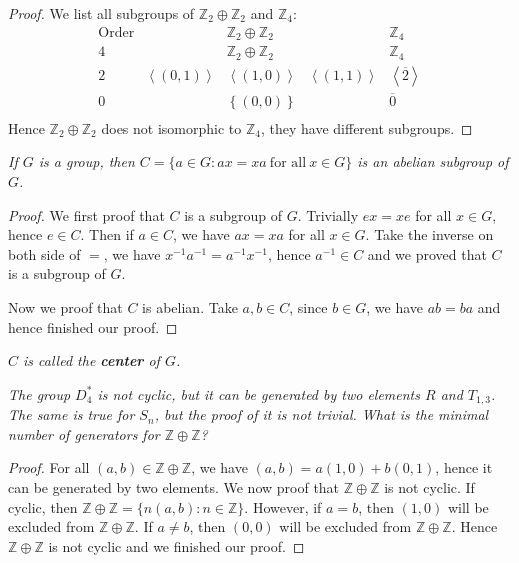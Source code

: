\begin{proof}
We list all subgroups of $\mathbb{Z}_2\oplus\mathbb{Z}_2$ and $\mathbb{Z}_4$:
$$
\begin{matrix}
	\mathrm{Order}&		&		\mathbb{Z} _2\oplus \mathbb{Z} _2&		&		\mathbb{Z} _4\\
	4&		&		\mathbb{Z} _2\oplus \mathbb{Z} _2&		&		\mathbb{Z} _4\\
	2&		\left< \left( 0,1 \right) \right>&		\left< \left( 1,0 \right) \right>&		\left< \left( 1,1 \right) \right>&		\left< \overline{2} \right>\\
	0&		&		\left\{ \left( 0,0 \right) \right\}&		&		\overline{0}\\
\end{matrix}
$$
Hence $\mathbb{Z}_2\oplus\mathbb{Z}_2$ does not isomorphic to $\mathbb{Z}_4$, they have different subgroups.
\end{proof}
\begin{problem}\em
If $G$ is a group, then $C=\{a\in G:ax=xa\ \text{for all}\ x\in G\}$ is an abelian subgroup of $G$.
\end{problem}
\begin{proof}
We first proof that $C$ is a subgroup of $G$. Trivially $ex=xe$ for all $x\in G$, hence $e\in C$. Then if $a\in C$, we have $ax=xa$ for all $x\in G$. Take the inverse on both side of $=$, we have $x^{-1}a^{-1}=a^{-1}x^{-1}$, hence $a^{-1}\in C$ and we proved that $C$ is a subgroup of $G$.\par
Now we proof that $C$ is abelian. Take $a,b\in C$, since $b\in G$, we have $ab=ba$ and hence finished our proof.
\end{proof}
\begin{note}\em
$C$ is called the \textbf{center} of $G$.
\end{note}
\begin{problem}\em
The group $D_4^*$ is not cyclic, but it can be generated by two elements $R$ and $T_{1,3}$. The same is true for $S_n$, but the proof of it is not trivial. What is the minimal number of generators for $\mathbb{Z}\oplus\mathbb{Z}$?
\end{problem}
\begin{proof}
For all $(a,b)\in\mathbb{Z}\oplus\mathbb{Z}$, we have $(a,b)=a(1,0)+b(0,1)$, hence it can be generated by two elements. We now proof that $\mathbb{Z}\oplus\mathbb{Z}$ is not cyclic. If cyclic, then $\mathbb{Z}\oplus\mathbb{Z}=\{n(a,b):n\in\mathbb{Z}\}$. However, if $a=b$, then $(1,0)$ will be excluded from $\mathbb{Z}\oplus\mathbb{Z}$. If $a\ne b$, then $(0,0)$ will be excluded from $\mathbb{Z}\oplus\mathbb{Z}$. Hence $\mathbb{Z}\oplus\mathbb{Z}$ is not cyclic and we finished our proof.
\end{proof}
